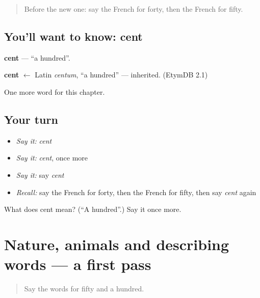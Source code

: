 \label{lesson:FR-C105-cent}



\begin{quote}
Before the new one: say the French for forty, then the French for fifty.
\end{quote}

\subsection*{You'll want to know: cent}
\textbf{cent} — \textquotedblleft{}a hundred\textquotedblright{}.

\begin{cousinweb}
\textbf{cent} $\leftarrow$ Latin \emph{centum}, \textquotedblleft{}a hundred\textquotedblright{} — inherited. (EtymDB 2.1)
\end{cousinweb}

\begin{grammarlens}[title={What you've built}]
One more word for this chapter.
\end{grammarlens}

\subsection*{Your turn}
\begin{itemize}
\raggedright
  \item \emph{Say it:} \emph{cent}
  \item \emph{Say it:} \emph{cent}, once more
  \item \emph{Say it:} say \emph{cent}
  \item \emph{Recall:} say the French for forty, then the French for fifty, then say \emph{cent} again
\end{itemize}

\begin{tcolorbox}[breakable,colback=teal!4,colframe=teal!35!black,title={Before you move on}]
What does cent mean? (\textquotedblleft{}A hundred\textquotedblright{}.) Say it once more.
\end{tcolorbox}
\section[(dialogue)]{Nature, animals and describing words — a first pass}

\label{lesson:FR-R105-first-pass-nature-animals-and-describing-words}



\begin{quote}
Say the words for fifty and a hundred.
\end{quote}

